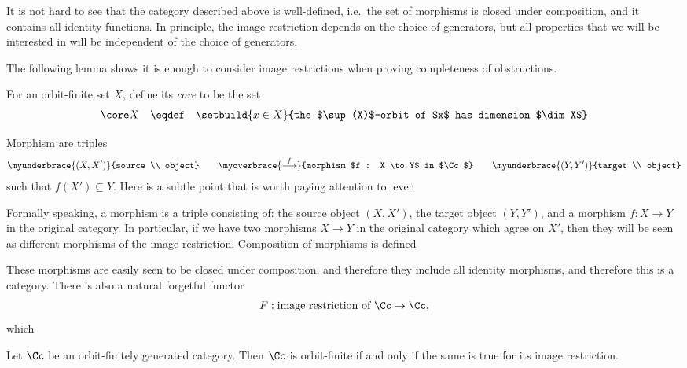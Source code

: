 It is not hard to see that the category described above is well-defined, i.e.~the set of morphisms is closed under composition, and it contains all identity functions. In principle, the image restriction depends on the choice of generators, but all properties that we will be interested in will be independent of the choice of generators.

The following lemma shows it is enough to consider image restrictions when proving completeness of obstructions. 


\begin{definition}
    For an orbit-finite set $X$, define its \emph{core} to be the set
    \begin{align*}
\core X 
\quad \eqdef \quad     \setbuild{ x \in X}{the $\sup(X)$-orbit of $x$ has dimension $\dim X$}
    \end{align*}
\end{definition}

Morphism are triples
\begin{align*}
\myunderbrace{(X,X')}{source \\ object} 
\qquad 
\myoverbrace{\stackrel f \longrightarrow}{morphism  $f : X \to Y$ in $\Cc$} 
\qquad 
\myunderbrace{(Y,Y')}{target \\ object}
\end{align*}
such that  $f(X') \subseteq Y$. Here is a subtle point that is worth paying attention to: even  

Formally speaking, a morphism is a triple consisting of: the source object $(X,X')$, the target object $(Y,Y')$, and a morphism $f : X \to Y$ in the original category. In particular, if we have two morphisms  $X \to Y$ in the original category which agree on $X'$, then they will be seen as different morphisms of the image restriction. Composition of morphisms is defined 

These morphisms are easily seen to be closed under composition, and therefore  they include all identity morphisms, and therefore this is a category. There is also a natural forgetful functor 
\begin{align*}
F : \text{image restriction of $\Cc$} \to \Cc,
\end{align*}
which 



\begin{lemma}\label{lem:orbit-finite-image-restriction}
    Let $\Cc$ be an orbit-finitely generated category. Then $\Cc$ is orbit-finite if and only if the same is true for its image restriction. 
\end{lemma}